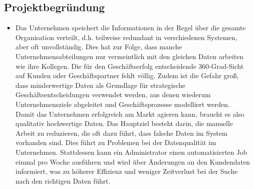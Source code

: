 \subsection{Projektbegründung} 
\label{sec:Projektbegruendung}
\begin{itemize}
	\item Das Unternehmen speichert die Informationen in der Regel über die gesamte Organisation verteilt, d.h. teilweise redundant in verschiedenen Systemen, aber oft unvollständig.
	Dies hat zur Folge, dass manche Unternehmensabteilungen nur vermeintlich mit den gleichen Daten arbeiten wie ihre Kollegen.
	Die für den Geschäftserfolg entscheidende 360-Grad-Sicht auf Kunden oder Geschäftspartner fehlt völlig. Zudem ist die Gefahr groß,
	dass minderwertige Daten als Grundlage für strategische Geschäftsentscheidungen verwendet werden, aus denen wiederum Unternehmensziele abgeleitet und Geschäftsprozesse modelliert werden. 
	Damit das Unternehmen erfolgreich am Markt agieren kann, braucht es also qualitativ hochwertige Daten.
	Das Hauptziel besteht darin, die manuelle Arbeit zu reduzieren, die oft dazu führt, dass falsche Daten im System vorhanden sind. Dies führt zu Problemen bei der Datenqualität im Unternehmen. 
	Stattdessen kann ein Administrator einen automatisierten Job einmal pro Woche ausführen und wird über Änderungen an den Kundendaten informiert, was zu höherer Effizienz und weniger Zeitverlust bei der Suche nach den richtigen Daten führt.
\end{itemize}

